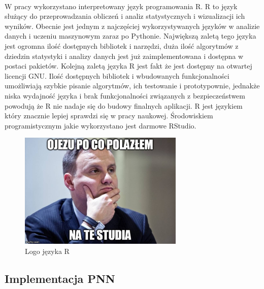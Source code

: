 \documentclass[a4paper,12pt,twoside]{article}
\begin{document}
\paragraph{}
W pracy  wykorzystano interpretowany język programowania R. R to język służący do przeprowadzania obliczeń i analiz statystycznych i wizualizacji ich wyników. Obecnie jest jednym z najczęściej wykorzystywanych języków w analizie danych i uczeniu maszynowym zaraz po Pythonie. Największą zaletą tego języka jest ogromna ilość dostępnych bibliotek i narzędzi, duża ilość algorytmów z dziedzin statystyki i analizy danych jest już zaimplementowana i dostępna w postaci pakietów. Kolejną zaletą języka R jest fakt że jest dostępny na otwartej licencji GNU. Ilość dostępnych bibliotek i wbudowanych funkcjonalności umożliwiają szybkie pisanie algorytmów, ich testowanie i prototypownie, jednakże niska wydajność języka i brak funkcjonalności związanych z bezpieczeństwem powodują że R nie nadaje się do budowy finalnych aplikacji. R jest językiem który znacznie lepiej sprawdzi się w pracy naukowej. Środowiskiem programistycznym jakie wykorzystano jest darmowe RStudio.
\begin{figure}[h]
    \centering
    \includegraphics[width=0.7\textwidth]{dudel.jpg}
    \caption{Logo języka R}
\end{figure}
 \newpage
\subsection{Implementacja PNN}
\end{document}
